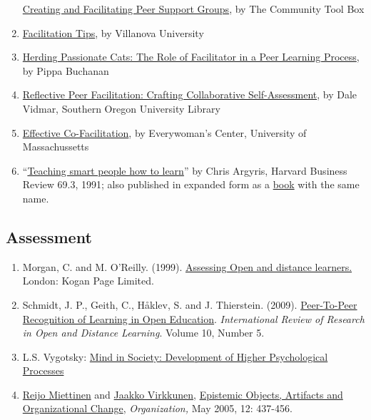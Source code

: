 \begin{enumerate}
  \href{http://ctb.ku.edu/en/tablecontents/section_1180.aspx}{Creating
  and Facilitating Peer Support Groups}, by The Community Tool Box
\item
  \href{http://www1.villanova.edu/content/villanova/artsci/vcle/resources/toolkit/_jcr_content/pagecontent/download_8/file.res/FacilitationTips.doc}{Facilitation
  Tips}, by Villanova University
\item
  \href{http://pippabuchanan.com/2011/09/04/herding-passionate-cats-the-role-of-facilitator-in-a-peer-learning-process/}{Herding
  Passionate Cats: The Role of Facilitator in a Peer Learning Process},
  by Pippa Buchanan
\item
  \href{http://webpages.sou.edu/~vidmar/SOARS2008/vidmar.ppt}{Reflective
  Peer Facilitation: Crafting Collaborative Self-Assessment}, by Dale
  Vidmar, Southern Oregon University Library
\item
  \href{http://www.umass.edu/ewc/ea/Facilitation\%20Skills/important\%20tips.doc}{Effective
  Co-Facilitation}, by Everywoman's Center, University of Massachussetts
\item
  ``\href{https://www.ncsu.edu/park_scholarships/pdf/chris_argyris_learning.pdf}{Teaching
  smart people how to learn}'' by Chris Argyris, Harvard Business Review
  69.3, 1991; also published in expanded form as a
  \href{http://www.amazon.com/Teaching-People-Harvard-Business-Classics/dp/1422126005}{book}
  with the same name.
\end{enumerate}

\hypertarget{assessment}{%
\subsection{Assessment}\label{assessment}}

\begin{enumerate}
\def\labelenumi{\arabic{enumi}.}
\item
  Morgan, C. and M. O'Reilly. (1999).
  \href{http://www.amazon.com/Assessing-Distance-Learners-Flexible-Learning/dp/0749428783/ref=tmm_pap_title_0?ie=UTF8\&qid=1388199564\&sr=1-1}{Assessing
  Open and distance learners.} London: Kogan Page Limited.
\item
  Schmidt, J. P., Geith, C., Håklev, S. and J. Thierstein. (2009).
  \href{http://www.irrodl.org/index.php/irrodl/article/view/641/1389}{Peer-To-Peer
  Recognition of Learning in Open Education}. \emph{International Review
  of Research in Open and Distance Learning}. Volume 10, Number 5.
\item
  L.S. Vygotsky:
  \href{http://books.google.com/books?id=RxjjUefze_oC\&printsec=frontcover\&source=gbs_atb\#v=onepage\&q\&f=false}{Mind
  in Society: Development of Higher Psychological Processes}
\item
  \href{http://org.sagepub.com/search?author1=Reijo+Miettinen\&sortspec=date\&submit=Submit}{Reijo
  Miettinen} and
  \href{http://org.sagepub.com/search?author1=Jaakko+Virkkunen\&sortspec=date\&submit=Submit}{Jaakko
  Virkkunen},
  \href{http://org.sagepub.com/content/12/3/437.abstract}{Epistemic
  Objects, Artifacts and Organizational Change}, \emph{Organization,}
  May 2005, 12: 437-456.
\end{enumerate}

